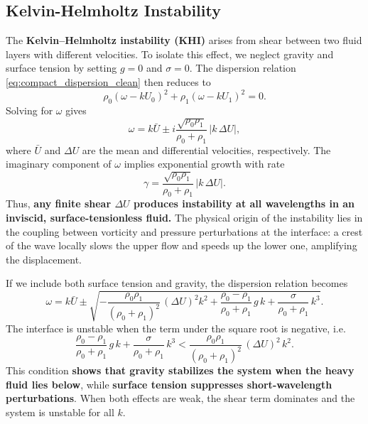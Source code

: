 \subsection{Kelvin-Helmholtz Instability}
\label{sec:kelvin_helmholtz}

The \textbf{Kelvin--Helmholtz instability (KHI)} arises from shear between two fluid layers with different velocities. 
To isolate this effect, we neglect gravity and surface tension by setting $g = 0$ and $\sigma = 0$. The dispersion relation \eqref{eq:compact_dispersion_clean} then reduces to
\begin{equation}
\rho_0 (\omega - k U_0)^2 + \rho_1 (\omega - k U_1)^2 = 0.
\end{equation}
Solving for $\omega$ gives
\begin{equation}
\label{eq:kh_solution}
\omega = k \bar{U} \pm i \frac{\sqrt{\rho_0 \rho_1}}{\rho_0 + \rho_1}\,|k\,\Delta U|,
\end{equation}
where $\bar{U}$ and $\Delta U$ are the mean and differential velocities, respectively. The imaginary component of $\omega$ implies exponential growth with rate
\begin{equation}
\label{eq:kh_growth_rate}
\gamma = \frac{\sqrt{\rho_0 \rho_1}}{\rho_0 + \rho_1}\,|k\,\Delta U|.
\end{equation}
Thus, \textbf{any finite shear $\Delta U$ produces instability at all wavelengths in an inviscid, surface-tensionless fluid.} The physical origin of the instability lies in the coupling between vorticity and pressure perturbations at the interface: a crest of the wave locally slows the upper flow and speeds up the lower one, amplifying the displacement.
\par
If we include both surface tension and gravity, the dispersion relation becomes
\[
\omega = k \bar{U} 
\pm 
\sqrt{
-\frac{\rho_0 \rho_1}{(\rho_0 + \rho_1)^2}\,(\Delta U)^2 k^2
+ \frac{\rho_0 - \rho_1}{\rho_0 + \rho_1}\,g\,k
+ \frac{\sigma}{\rho_0 + \rho_1}\,k^3 }.
\]
The interface is unstable when the term under the square root is negative, i.e.
\begin{equation}
\label{eq:kh_instability_condition}
\frac{\rho_0 - \rho_1}{\rho_0 + \rho_1}\,g\,k + \frac{\sigma}{\rho_0 + \rho_1}\,k^3 
< \frac{\rho_0 \rho_1}{(\rho_0 + \rho_1)^2}\,(\Delta U)^2\,k^2.
\end{equation}
This condition \textbf{shows that gravity stabilizes the system when the heavy fluid lies below}, 
while\textbf{ surface tension suppresses short-wavelength perturbations}. When both effects are weak, the shear term dominates and the system is unstable for all $k$.

